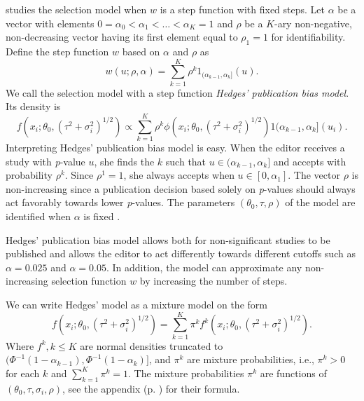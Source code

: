 \documentclass[article]{ajs}
\numberwithin{equation}{section}
\numberwithin{figure}{section}
\theoremstyle{plain}
\theoremstyle{definition}
\theoremstyle{definition}
\theoremstyle{plain}
\renewcommand{\sqrt}[1]{{(#1)^{1/2}}}
\begin{document}
\citet{hedges1992modeling} studies the selection model when $w$ is a step function with fixed steps. Let $\alpha$ be a vector with elements $0=\alpha_{0}<\alpha_{1}<\ldots<\alpha_{K}=1$ and $\rho$ be a $K$-ary non-negative, non-decreasing vector having its first element equal to $\rho_{1}=1$ for identifiability. Define the step function $w$ based on $\alpha$ and $\rho$ as
\begin{equation}
w(u;\rho,\alpha)=\sum_{k=1}^{K}\rho^{k}1_{(\alpha_{k-1},\alpha_{k}]}(u).\label{eq:step function}
\end{equation}
We call the selection model with a step function \emph{Hedges' publication bias model}. Its density is
\begin{equation}
f(x_{i};\theta_{0},\sqrt{\tau^{2}+\sigma_{i}^{2}})\propto\sum_{k=1}^{K}\rho^{k}\phi(x_{i};\theta_{0},\sqrt{\tau^{2}+\sigma_{i}^{2}})1{(\alpha_{k-1},\alpha_{k}]}(u_{i}).\label{eq:hedges model}
\end{equation}
Interpreting Hedges' publication bias model is easy. When the editor receives a study with \textit{p}-value $u$, she finds the $k$ such that $u\in(\alpha_{k-1},\alpha_{k}]$ and accepts with probability $\rho^{k}$. Since $\rho^{1}=1$, she always accepts when $u\in[0,\alpha_{1}]$. The vector $\rho$ is non-increasing since a publication decision based solely on \textit{p}-values should always act favorably towards lower \textit{p}-values. The parameters $(\theta_{0},\tau,\rho)$ of the model are identified when $\alpha$ is fixed \citep[Web Appendix A]{moss2019modelling}.

Hedges' publication bias model allows both for non-significant studies to be published and allows the editor to act differently towards different cutoffs such as $\alpha=0.025$ and $\alpha=0.05$. In addition, the model can approximate any non-increasing selection function $w$ by increasing the number of steps.

We can write Hedges' model as a mixture model on the form
\begin{equation}
f(x_{i};\theta_{0},\sqrt{\tau^{2}+\sigma_{i}^{2}})=\sum_{k=1}^{K}\pi^{k}f^{k}(x_{i};\theta_{0},\sqrt{\tau^{2}+\sigma_{i}^{2}}).\label{eq:mixture model formulation}
\end{equation}
Where $f^{k},k\leq K$ are normal densities
truncated to $(\Phi^{-1}(1-\alpha_{k-1}),\Phi^{-1}(1-\alpha_k)]$, and $\pi^{k}$ are mixture probabilities, i.e., $\pi^{k}>0$ for each $k$ and $\sum_{k=1}^{K}\pi^{k}=1$. The mixture probabilities $\pi^{k}$ are functions of $(\theta_{0},\tau,\sigma_{i},\rho)$, see the appendix (p. \pageref{eq:pi_i formula}) for their formula.
\end{document}
